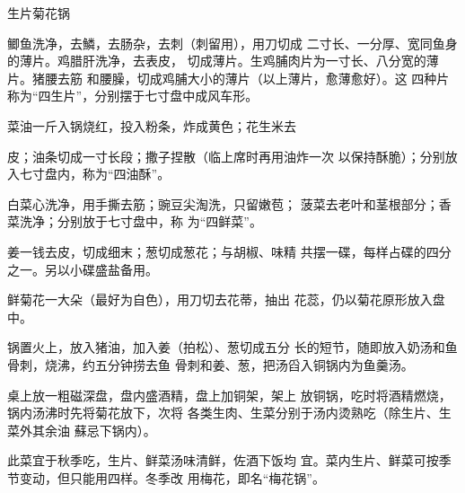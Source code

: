 \begin{recipe}{生片菊花锅}

\ingredients



\cooking

\step 鲫鱼洗净，去鱗，去肠杂，去刺（刺留用），用刀切成 二寸长、一分厚、宽同鱼身的薄片。鸡腊肝洗净，去表皮， 切成薄片。生鸡脯肉片为一寸长、八分宽的薄片。猪腰去筋 和腰臊，切成鸡脯大小的薄片（以上薄片，愈薄愈好）。这 四种片称为“四生片”，分别摆于七寸盘中成风车形。

\step 菜油一斤入锅烧红，投入粉条，炸成黄色；花生米去

皮；油条切成一寸长段；撒子捏散（临上席时再用油炸一次 以保持酥脆）；分别放入七寸盘内，称为“四油酥”。

白菜心洗净，用手撕去筋；豌豆尖淘洗，只留嫩苞； 菠菜去老叶和茎根部分；香菜洗净；分别放于七寸盘中，称 为“四鲜菜”。

\step 姜一钱去皮，切成细末；葱切成葱花；与胡椒、味精 共摆一碟，每样占碟的四分之一。另以小碟盛盐备用。

\step 鲜菊花一大朵（最好为自色），用刀切去花蒂，抽出 花蕊，仍以菊花原形放入盘中。

\step 锅置火上，放入猪油，加入姜（拍松）、葱切成五分 长的短节，随即放入奶汤和鱼骨刺，烧沸，约五分钟捞去鱼 骨刺和姜、葱，把汤舀入铜锅内为鱼羹汤。

\step 桌上放一粗磁深盘，盘内盛酒精，盘上加铜架，架上 放铜锅，吃时将酒精燃烧，锅内汤沸时先将菊花放下，次将 各类生肉、生菜分别于汤内烫熟吃（除生片、生菜外其余油 蘇忌下锅内）。

\notes

此菜宜于秋季吃，生片、鲜菜汤味清鲜，佐酒下饭均 宜。菜内生片、鲜菜可按季节变动，但只能用四样。冬季改 用梅花，即名“梅花锅”。

\end{recipe}

